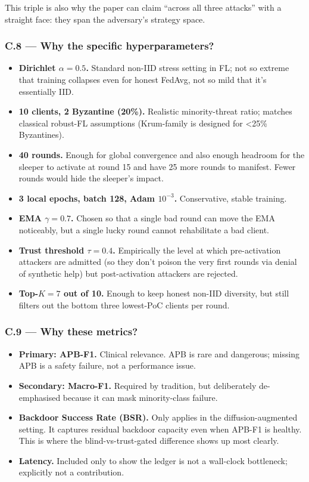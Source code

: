 \documentclass[11pt,a4paper]{article}
\begin{document}
This triple is also why the paper can claim ``across all three attacks''
with a straight face: they span the adversary's strategy space.

\subsubsection{C.8 --- Why the specific hyperparameters?}

\begin{itemize}
\item \textbf{Dirichlet $\alpha=0.5$.} Standard non-IID stress setting in FL; not so extreme that training collapses even for honest FedAvg, not so mild that it's essentially IID.
\item \textbf{10 clients, 2 Byzantine (20\%).} Realistic minority-threat ratio; matches classical robust-FL assumptions (Krum-family is designed for <25\% Byzantines).
\item \textbf{40 rounds.} Enough for global convergence and also enough headroom for the sleeper to activate at round 15 and have 25 more rounds to manifest. Fewer rounds would hide the sleeper's impact.
\item \textbf{3 local epochs, batch 128, Adam $10^{-3}$.} Conservative, stable training.
\item \textbf{EMA $\gamma=0.7$.} Chosen so that a single bad round can move the EMA noticeably, but a single lucky round cannot rehabilitate a bad client.
\item \textbf{Trust threshold $\tau=0.4$.} Empirically the level at which pre-activation attackers are admitted (so they don't poison the very first rounds via denial of synthetic help) but post-activation attackers are rejected.
\item \textbf{Top-$K=7$ out of 10.} Enough to keep honest non-IID diversity, but still filters out the bottom three lowest-PoC clients per round.
\end{itemize}

\subsubsection{C.9 --- Why these metrics?}

\begin{itemize}
\item \textbf{Primary: APB-F1.} Clinical relevance. APB is rare and dangerous; missing APB is a safety failure, not a performance issue.
\item \textbf{Secondary: Macro-F1.} Required by tradition, but deliberately de-emphasised because it can mask minority-class failure.
\item \textbf{Backdoor Success Rate (BSR).} Only applies in the diffusion-augmented setting. It captures residual backdoor capacity even when APB-F1 is healthy. This is where the blind-vs-trust-gated difference shows up most clearly.
\item \textbf{Latency.} Included only to show the ledger is not a wall-clock bottleneck; explicitly not a contribution.
\end{itemize}
\end{document}

